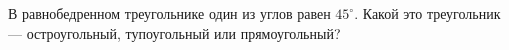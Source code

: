 В равнобедренном треугольнике один из углов равен $45^\circ$. Какой это треугольник --- остроугольный, тупоугольный или прямоугольный?
